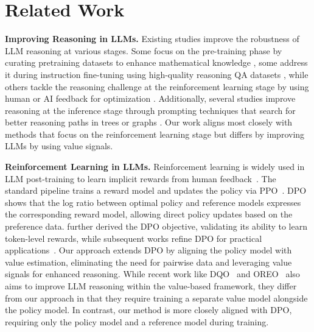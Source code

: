 \section{Related Work}
\textbf{Improving Reasoning in LLMs.} Existing studies improve the robustness of LLM reasoning at various stages. Some focus on the pre-training phase by curating pretraining datasets to enhance mathematical knowledge \citep{shao2024deepseekmath,azerbayev2023llemma}, some address it during instruction fine-tuning using high-quality reasoning QA datasets \citep{mitra2023orca,mukherjee2023orca,yue2023mammoth,yu2023metamath}, while others tackle the reasoning challenge at the reinforcement learning stage by using human or AI feedback for optimization \citep{yuan2024advancing,lai2024step}. Additionally, several studies improve reasoning at the inference stage through prompting techniques that search for better reasoning paths in trees or graphs \citep{yao2024tree,besta2024graph,wang2023plan,yang2024buffer,zheng2023take}. Our work aligns most closely with methods that focus on the reinforcement learning stage but differs by improving LLMs by using value signals. 

\textbf{Reinforcement Learning in LLMs.} Reinforcement learning is widely used in LLM post-training to learn implicit rewards from human feedback~\citep{ouyang2022training,dubey2024llama,yang2024qwen2}. The standard pipeline trains a reward model and updates the policy via PPO~\citep{schulman2017proximal}. DPO~\citep{rafailov2023directpreferenceoptimizationlanguage} shows that the log ratio between optimal policy and reference models expresses the corresponding reward model, allowing direct policy updates based on the preference data. \citet{rafailov2024r} further derived the DPO objective, validating its ability to learn token-level rewards, while subsequent works refine DPO for practical applications~\citep{ethayarajh2024kto,chen2024noise,azar2024general}. Our approach extends DPO by aligning the policy model with value estimation, eliminating the need for pairwise data and leveraging value signals for enhanced reasoning. While recent work like DQO~\citep{liu2024enhancing} and OREO~\cite{wang2024offline} also aims to improve LLM reasoning within the value-based framework, they differ from our approach in that they require training a separate value model alongside the policy model. In contrast, our method is more closely aligned with DPO, requiring only the policy model and a reference model during training.


